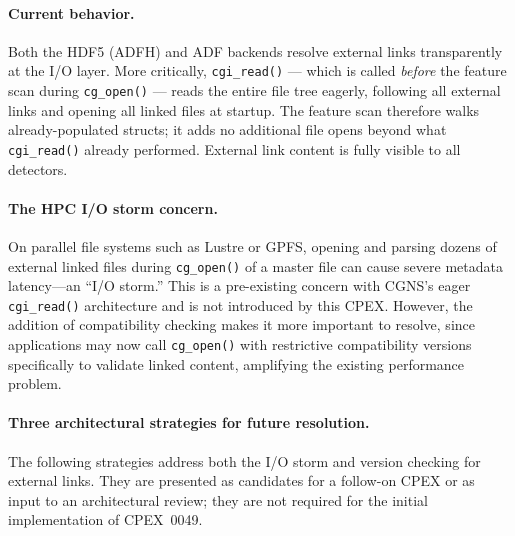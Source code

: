 \documentclass[11pt,letterpaper]{article}
\begin{document}
\paragraph{Current behavior.}
Both the HDF5 (ADFH) and ADF backends resolve external links
transparently at the I/O layer.  More critically, \texttt{cgi\_read()}
--- which is called \emph{before} the feature scan during
\texttt{cg\_open()} --- reads the entire file tree eagerly, following
all external links and opening all linked files at startup.  The
feature scan therefore walks already-populated structs; it adds no
additional file opens beyond what \texttt{cgi\_read()} already
performed.  External link content is fully visible to all detectors.

\paragraph{The HPC I/O storm concern.}
On parallel file systems such as Lustre or GPFS, opening and parsing
dozens of external linked files during \texttt{cg\_open()} of a
master file can cause severe metadata latency---an ``I/O storm.''
This is a pre-existing concern with CGNS's eager \texttt{cgi\_read()}
architecture and is not introduced by this CPEX.  However, the
addition of compatibility checking makes it more important to resolve,
since applications may now call \texttt{cg\_open()} with restrictive
compatibility versions specifically to validate linked content, amplifying the
existing performance problem.

\paragraph{Three architectural strategies for future resolution.}
The following strategies address both the I/O storm and version
checking for external links.  They are presented as candidates for
a follow-on CPEX or as input to an architectural review; they are
not required for the initial implementation of CPEX~0049.
\end{document}

